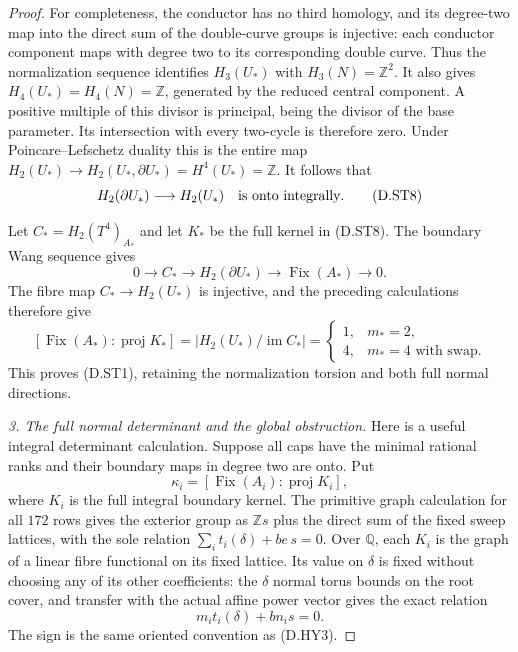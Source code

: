 \begin{proof}
For completeness, the conductor has no third homology, and
its degree-two map into the direct sum of the double-curve
groups is injective: each conductor component maps with degree
two to its corresponding double curve. Thus the normalization
sequence identifies $H_3(U_*)$ with $H_3(N)=\mathbb Z^2$.
It also gives $H_4(U_*)=H_4(N)=\mathbb Z$, generated by the
reduced central component. A positive multiple of this divisor is principal,
being the divisor of the base parameter. Its intersection with
every two-cycle is therefore zero. Under Poincare--Lefschetz
duality this is the entire map
$H_2(U_*)\to H_2(U_*,\partial U_*)=H^4(U_*)=\mathbb Z$.
It follows that
\[
 H_2(\partial U_*)\longrightarrow H_2(U_*)
 \quad\hbox{is onto integrally}.                            \tag{D.ST8}
\]

Let $C_*=H_2(T^4)_{A_*}$ and let $K_*$ be the full kernel in
(D.ST8). The boundary Wang sequence gives
\[
 0\longrightarrow C_*\longrightarrow H_2(\partial U_*)
        \longrightarrow\operatorname{Fix}(A_*)
        \longrightarrow0.
\]
The fibre map $C_*\to H_2(U_*)$ is injective, and the preceding
calculations therefore give
\[
 [\operatorname{Fix}(A_*):\operatorname{proj}K_*]
 =\bigl|H_2(U_*)/\operatorname{im}C_*\bigr|
 =\begin{cases}1,&m_*=2,\\4,&m_*=4\text{ with swap}.
   \end{cases}                                             \tag{D.ST9}
\]
This proves (D.ST1), retaining the normalization torsion and
both full normal directions.

\emph{3. The full normal determinant and the global obstruction.}
Here is a useful integral determinant calculation. Suppose all
caps have the minimal rational ranks and their boundary maps
in degree two are onto. Put
\[
 \kappa_i=[\operatorname{Fix}(A_i):
                         \operatorname{proj}K_i],
\]
where $K_i$ is the full integral boundary kernel. The primitive
graph calculation for all $172$ rows gives the exterior group
as $\mathbb Zs$ plus the direct sum of the fixed sweep lattices,
with the sole relation $\sum_i t_i(\delta)+be\,s=0$.
Over $\mathbb Q$, each $K_i$ is the graph of a linear fibre
functional on its fixed lattice. Its value on $\delta$ is fixed
without choosing any of its other coefficients: the
$\delta$ normal torus bounds on the root cover, and transfer
with the actual affine power vector gives the exact relation
\[
 m_i t_i(\delta)+bn_i s=0.                                 \tag{D.ST10}
\]
The sign is the same oriented convention as (D.HY3).


\end{proof}
